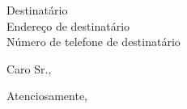 \documentclass[a4paper,11pt]{letter}
\begin{document}
\begin{letter}{Destinatário\\Endereço de destinatário\\Número de telefone de destinatário}
	
\opening{Caro Sr.,}


\closing{Atenciosamente,}


\end{letter}
\end{document}
